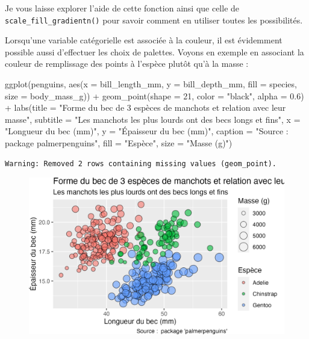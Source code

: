 \documentclass[
  letterpaper,
  DIV=11,
  numbers=noendperiod]{scrreprt}
\newenvironment{Shaded}{\begin{snugshade}}{\end{snugshade}}
\newcommand{\AttributeTok}[1]{\textcolor[rgb]{0.40,0.45,0.13}{#1}}
\newcommand{\DecValTok}[1]{\textcolor[rgb]{0.68,0.00,0.00}{#1}}
\newcommand{\FloatTok}[1]{\textcolor[rgb]{0.68,0.00,0.00}{#1}}
\newcommand{\FunctionTok}[1]{\textcolor[rgb]{0.28,0.35,0.67}{#1}}
\newcommand{\NormalTok}[1]{\textcolor[rgb]{0.00,0.23,0.31}{#1}}
\newcommand{\SpecialCharTok}[1]{\textcolor[rgb]{0.37,0.37,0.37}{#1}}
\newcommand{\StringTok}[1]{\textcolor[rgb]{0.13,0.47,0.30}{#1}}
\begin{document}
Je vous laisse explorer l'aide de cette fonction ainsi que celle de
\texttt{scale\_fill\_gradientn()} pour savoir comment en utiliser toutes
les possibilités.

Lorsqu'une variable catégorielle est associée à la couleur, il est
évidemment possible aussi d'effectuer les choix de palettes. Voyons en
exemple en associant la couleur de remplissage des points à l'espèce
plutôt qu'à la masse :

\begin{Shaded}
\begin{Highlighting}[]
\FunctionTok{ggplot}\NormalTok{(penguins, }\FunctionTok{aes}\NormalTok{(}\AttributeTok{x =}\NormalTok{ bill\_length\_mm, }\AttributeTok{y =}\NormalTok{ bill\_depth\_mm,}
                     \AttributeTok{fill =}\NormalTok{ species, }\AttributeTok{size =}\NormalTok{ body\_mass\_g)) }\SpecialCharTok{+}
  \FunctionTok{geom\_point}\NormalTok{(}\AttributeTok{shape =} \DecValTok{21}\NormalTok{, }\AttributeTok{color =} \StringTok{"black"}\NormalTok{, }\AttributeTok{alpha =} \FloatTok{0.6}\NormalTok{) }\SpecialCharTok{+}
  \FunctionTok{labs}\NormalTok{(}\AttributeTok{title =} \StringTok{"Forme du bec de 3 espèces de manchots et relation avec leur masse"}\NormalTok{,}
       \AttributeTok{subtitle =} \StringTok{"Les manchots les plus lourds ont des becs longs et fins"}\NormalTok{,}
       \AttributeTok{x =} \StringTok{"Longueur du bec (mm)"}\NormalTok{,}
       \AttributeTok{y =} \StringTok{"Épaisseur du bec (mm)"}\NormalTok{,}
       \AttributeTok{caption =} \StringTok{"Source :  package \textquotesingle{}palmerpenguins\textquotesingle{}"}\NormalTok{,}
       \AttributeTok{fill =} \StringTok{"Espèce"}\NormalTok{,}
       \AttributeTok{size =} \StringTok{"Masse (g)"}\NormalTok{)}
\end{Highlighting}
\end{Shaded}

\begin{verbatim}
Warning: Removed 2 rows containing missing values (geom_point).
\end{verbatim}

\begin{figure}[H]

{\centering \includegraphics{./03-visualization_files/figure-pdf/unnamed-chunk-98-1.png}

}

\end{figure}
\end{document}
